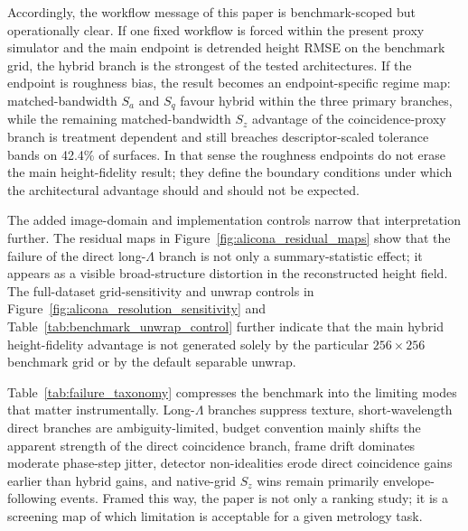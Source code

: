 \documentclass[photonics,article,submit,pdftex,moreauthors]{Definitions/mdpi}
\begin{document}
Accordingly, the workflow message of this paper is benchmark-scoped but operationally clear. If one fixed workflow is forced within the present proxy simulator and the main endpoint is detrended height RMSE on the benchmark grid, the hybrid branch is the strongest of the tested architectures. If the endpoint is roughness bias, the result becomes an endpoint-specific regime map: matched-bandwidth $S_a$ and $S_q$ favour hybrid within the three primary branches, while the remaining matched-bandwidth $S_z$ advantage of the coincidence-proxy branch is treatment dependent and still breaches descriptor-scaled tolerance bands on 42.4\% of surfaces. In that sense the roughness endpoints do not erase the main height-fidelity result; they define the boundary conditions under which the architectural advantage should and should not be expected.

The added image-domain and implementation controls narrow that interpretation further. The residual maps in Figure~\ref{fig:alicona_residual_maps} show that the failure of the direct long-$\Lambda$ branch is not only a summary-statistic effect; it appears as a visible broad-structure distortion in the reconstructed height field. The full-dataset grid-sensitivity and unwrap controls in Figure~\ref{fig:alicona_resolution_sensitivity} and Table~\ref{tab:benchmark_unwrap_control} further indicate that the main hybrid height-fidelity advantage is not generated solely by the particular $256\times 256$ benchmark grid or by the default separable unwrap.



Table~\ref{tab:failure_taxonomy} compresses the benchmark into the limiting modes that matter instrumentally. Long-$\Lambda$ branches suppress texture, short-wavelength direct branches are ambiguity-limited, budget convention mainly shifts the apparent strength of the direct coincidence branch, frame drift dominates moderate phase-step jitter, detector non-idealities erode direct coincidence gains earlier than hybrid gains, and native-grid $S_z$ wins remain primarily envelope-following events. Framed this way, the paper is not only a ranking study; it is a screening map of which limitation is acceptable for a given metrology task.
\end{document}
